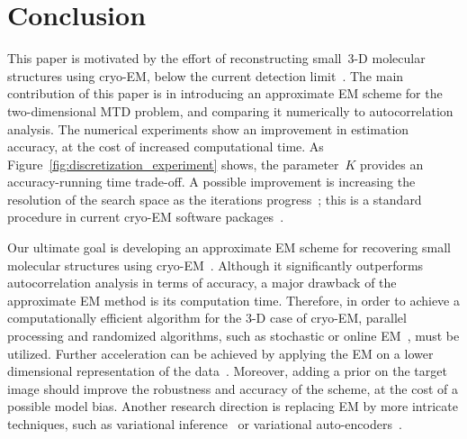 \documentclass{article}
\begin{document}
\section{Conclusion}
\label{sec:conclusion}
This paper is motivated by the effort of reconstructing small~\mbox{3-D} molecular structures using \mbox{cryo-EM}, below the current detection limit~\cite{bendory2018toward}. The main contribution of this paper is in introducing an approximate EM scheme for the two-dimensional MTD problem, and comparing it numerically to autocorrelation analysis. The numerical experiments show an improvement in estimation accuracy, at the cost of increased computational time. As Figure~\ref{fig:discretization_experiment} shows, the parameter~$K$ provides an accuracy-running time trade-off. A possible improvement is increasing the resolution of the search space as the iterations progress~\cite{lan2020multi}; this is a standard procedure in current cryo-EM software packages~\cite{scheres2012relion, punjani2017cryosparc}.

Our ultimate goal is developing an approximate EM scheme for recovering small molecular structures using \mbox{cryo-EM}~\cite{bendory2018toward}. Although it significantly outperforms autocorrelation analysis in terms of accuracy, a major drawback of the approximate EM method is its computation time. Therefore, in order to achieve a computationally efficient algorithm for the \mbox{3-D} case of \mbox{cryo-EM}, parallel processing and randomized algorithms, such as stochastic or online EM~\cite{nielsen2000stochastic, chen2018stochastic, liang2009online, cappe2009line, cappe2011online}, must be utilized. Further acceleration can be achieved by applying the EM on a lower dimensional representation of the data~\cite{dvornek2015subspaceem}. Moreover, adding a prior on the target image should improve the robustness and accuracy of the scheme, at the cost of a possible model bias. Another research direction is replacing EM by more intricate techniques, such as variational inference~\cite{blei2017variational} or variational auto-encoders~\cite{rosenbaum2021inferring}.

\vfill
\newpage



\end{document}
